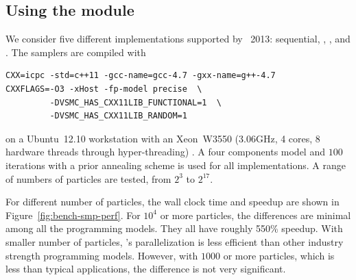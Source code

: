 \subsection{Using the \protect\smp module}
\label{sub:Using the SMP module}

We consider five different implementations supported by \icpc~2013:
sequential, \tbb, \cilk, \openmp and \cppoo{} . The samplers
are compiled with
\begin{verbatim}
CXX=icpc -std=c++11 -gcc-name=gcc-4.7 -gxx-name=g++-4.7
CXXFLAGS=-O3 -xHost -fp-model precise  \
         -DVSMC_HAS_CXX11LIB_FUNCTIONAL=1  \
         -DVSMC_HAS_CXX11LIB_RANDOM=1
\end{verbatim}
on a Ubuntu~12.10 workstation with an Xeon~W3550 (3.06GHz, 4 cores, 8 hardware
threads through hyper-threading) \cpu. A four components model and $100$
iterations with a prior annealing scheme is used for all implementations. A
range of numbers of particles are tested, from $2^3$ to $2^{17}$.

For different number of particles, the wall clock time and speedup are shown
in Figure~\ref{fig:bench-smp-perf}. For $10^4$ or more particles, the
differences are minimal among all the programming models. They all have
roughly 550\% speedup. With smaller number of particles, \vsmc's \cppoo
parallelization is less efficient than other industry strength programming
models. However, with $1000$ or more particles, which is less than typical
applications, the difference is not very significant.

